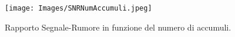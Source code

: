 \begin{figure}[h!]
    \centering
    \texttt{[image: Images/SNRNumAccumuli.jpeg]}
    \caption{Rapporto Segnale-Rumore in funzione del numero di accumuli.}
    \label{fig:my_label}
\end{figure}